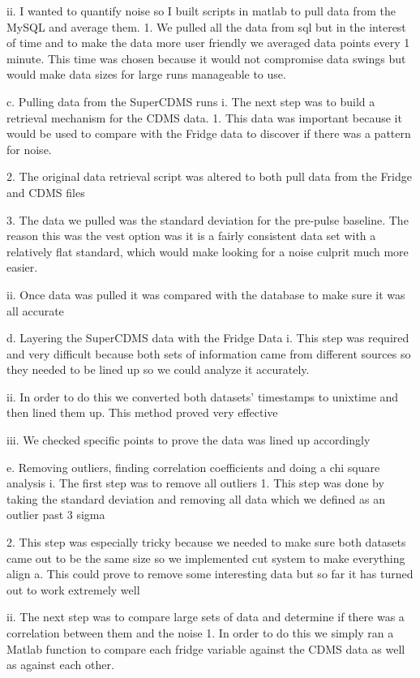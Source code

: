 ii.	I wanted to quantify noise so I built scripts in matlab to pull data from the MySQL and average them.
1.	We pulled all the data from sql but in the interest of time and to make the data more user friendly we averaged data points every 1 minute. This time was chosen because it would not compromise data swings but would make data sizes for large runs manageable to use. 

c.	Pulling data from the SuperCDMS runs
i.	The next step was to build a retrieval mechanism for the CDMS data. 
1.	This data was important because it would be used to compare with the Fridge data to discover if there was a pattern for noise.

2.	The original data retrieval script was altered to both pull data from the Fridge and CDMS files

3.	The data we pulled was the standard deviation for the pre-pulse baseline. The reason this was the vest option was it is a fairly consistent data set with a relatively flat standard, which would make looking for a noise culprit much more easier. 

ii.	Once data was pulled it was compared with the database to make sure it was all accurate

d.	Layering the SuperCDMS data with the Fridge Data
i.	This step was required and very difficult because both sets of information came from different sources so they needed to be lined up so we could analyze it accurately. 

ii.	In order to do this we converted both datasets’ timestamps to unixtime and then lined them up. This method proved very effective

iii.	We checked specific points to prove the data was lined up accordingly

e.	Removing outliers, finding correlation coefficients and doing a chi square analysis
i.	The first step was to remove all outliers
1.	This step was done by taking the standard deviation and removing all data which we defined as an outlier past 3 sigma

2.	This step was especially tricky because we needed to make sure both datasets came out to be the same size so we implemented cut system to make everything align
a.	This could prove to remove some interesting data but so far it has turned out to work extremely well

ii.	The next step was to compare large sets of data and determine if there was a correlation between them and the noise
1.	In order to do this we simply ran a Matlab function to compare each fridge variable against the CDMS data as well as against each other.

